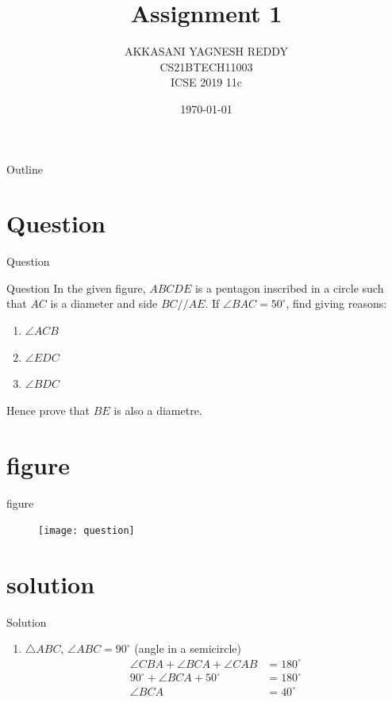 \documentclass{beamer}
\title{Assignment 1}
\author{AKKASANI YAGNESH REDDY \\
     CS21BTECH11003 \\
     ICSE 2019 11c }
\date{\today}
\begin{document}
     \begin{frame}
     \maketitle    
     \end{frame}
     
     \logo{}
     
     \begin{frame}{Outline}
    \tableofcontents
     \end{frame}

   \section{Question}
   \begin{frame}{Question}
   \begin{block}{Question}
           In the given figure, $ABCDE$ is a pentagon inscribed in a circle such that $AC$ is a diameter and side $BC//AE$. If $ \angle{BAC} = 50^{\circ} $, find giving reasons:
    \begin{enumerate}
    \item $\angle ACB$
    \item $\angle EDC$
    \item $\angle BDC$
    \end{enumerate}
Hence prove that $BE$ is also a diametre.
       \end{block}
     \end{frame}
      \section{figure}
     \begin{frame}{figure}
       \begin{figure}[h!]  
            \texttt{[image: question]}
            \label{Fig1} 
             \caption{}
      \end{figure}
         
     \end{frame}
     
     \section{solution}
     \begin{frame}{Solution}
       \begin{enumerate}
    \item $\triangle ABC $,  $ \angle ABC = 90^{\circ} $ (angle in a semicircle)
    \begin{align}
      \angle{CBA} +\angle BCA+\angle CAB &=180^{\circ}\\
        90^{\circ}+\angle BCA+50^{\circ} &=180^{\circ}\\
        \angle BCA &=40^{\circ}
    \end{align}
    \end{enumerate}
     \end{frame}
     
\end{document}
